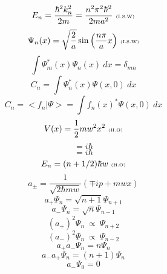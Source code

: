 \documentclass[10pt]{article}
\begin{document}
\begin{multicols}{3}
\begin{equation*}
E_n=\frac{\hbar^2k_{n}^{2}}{2m}=\frac{n^2\pi^2\hbar^2}{2ma^2} \ \text{\tiny (I.S.W)} 
\end{equation*}
\begin{equation*}
\Psi_n(x)=\sqrt{\frac{2}{a}}\sin{\left(\frac{n\pi}{a}x\right)} \ \text{\tiny (I.S.W)}
\end{equation*}
\begin{equation*}
\int \Psi_{m}^{*}(x)\Psi_{n}(x)  \ dx=\delta_{mn}
\end{equation*}
\begin{equation*}
C_n=\int \Psi_{n}^{*}(x)\Psi(x,0)  \ dx 
\end{equation*}
\begin{equation*}
C_n=<f_n|\Psi>=\int f_n(x)^{*}\Psi(x,0)  \ dx
\end{equation*}
\begin{equation*}
V(x)=\frac{1}{2}mw^2x^2 \ \text{\tiny (H.O)}
\end{equation*}
\begin{equation*}
[x,p]=i\hbar
\end{equation*}
\begin{equation*}
[\hat{x},\hat{p}]=i\hbar
\end{equation*}
\begin{equation*}
E_n=(n+1/2)\hbar w \ \text{\tiny (H.O)}
\end{equation*}
\begin{equation*}
a_{\pm}=\frac{1}{\sqrt{2\hbar mw}}(\mp ip+mwx)
\end{equation*}
\begin{equation*}
a_+\Psi_n=\sqrt{n+1}\Psi_{n+1}
\end{equation*}
\begin{equation*}
a_-\Psi_n=\sqrt{n}\Psi_{n-1}
\end{equation*}
\begin{equation*}
(a_+)^2\Psi_n \ \propto \ \Psi_{n+2}
\end{equation*}
\begin{equation*}
(a_-)^2\Psi_n \ \propto \ \Psi_{n-2}
\end{equation*}
\begin{equation*}
a_+a_-\Psi_n=n\Psi_n
\end{equation*}
\begin{equation*}
a_-a_+\Psi_n=(n+1)\Psi_n
\end{equation*}
\begin{equation*}
a_-\Psi_0=0
\end{equation*}

\end{multicols}
\end{document}
